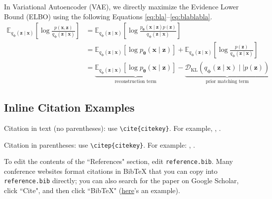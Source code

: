 \documentclass[12pt,letterpaper]{article}
\begin{document}
In Variational Autoencoder (VAE), we directly maximize the Evidence Lower Bound (ELBO) using the following Equations \ref{eq:bla}--\ref{eq:blablabla}.
\begin{align}
  \mathbb{E}_{q_{\boldsymbol{\phi}}(\boldsymbol{z}\mid\boldsymbol{x})}\left[\log\frac{p(\boldsymbol{x}, \boldsymbol{z})}{q_{\boldsymbol{\phi}}(\boldsymbol{z}\mid\boldsymbol{x})}\right]
  &= \mathbb{E}_{q_{\boldsymbol{\phi}}(\boldsymbol{z}\mid\boldsymbol{x})}\left[\log\frac{p_{\boldsymbol{\theta}}(\boldsymbol{x}\mid\boldsymbol{z})p(\boldsymbol{z})}{q_{\boldsymbol{\phi}}(\boldsymbol{z}\mid\boldsymbol{x})}\right] \label{eq:bla} \\
  &= \mathbb{E}_{q_{\boldsymbol{\phi}}(\boldsymbol{z}\mid\boldsymbol{x})}\left[\log p_{\boldsymbol{\theta}}(\boldsymbol{x}\mid\boldsymbol{z})\right] + \mathbb{E}_{q_{\boldsymbol{\phi}}(\boldsymbol{z}\mid\boldsymbol{x})}\left[\log\frac{p(\boldsymbol{z})}{q_{\boldsymbol{\phi}}(\boldsymbol{z}\mid\boldsymbol{x})}\right] \label{eq:blabla} \\
  &= \underbrace{\mathbb{E}_{q_{\boldsymbol{\phi}}(\boldsymbol{z}\mid\boldsymbol{x})}\left[\log p_{\boldsymbol{\theta}}(\boldsymbol{x}\mid\boldsymbol{z})\right]}_\text{reconstruction term} - \underbrace{\mathcal{D}_{\text{KL}}(q_{\boldsymbol{\phi}}(\boldsymbol{z}\mid\boldsymbol{x}) \mid\mid p(\boldsymbol{z}))}_\text{prior matching term} \label{eq:blablabla}
\end{align}

\subsection{Inline Citation Examples}

Citation in text (no parentheses): use \texttt{{\textbackslash}cite\{citekey\}}. 
For example, \cite{breiman2011}, \cite{devlin2019bert}.

Citation in parentheses: use \texttt{{\textbackslash}citep\{citekey\}}. 
For example: \citep{vaswani2023attention}, \citep{karras2019stylebased}.



\makereference

{\color{blue} To edit the contents of the ``References" section, edit \texttt{reference.bib}. Many conference websites format citations in BibTeX that you can copy into \texttt{reference.bib} directly; you can also search for the paper on Google Scholar, click ``Cite", and then click ``BibTeX" (\href{https://scholar.google.com/scholar?hl=en&as_sdt=0%2C23&q=attention+is+all+you+need&btnG=#d=gs_cit&t=1700436667623&u=%2Fscholar%3Fq%3Dinfo%3A5Gohgn6QFikJ%3Ascholar.google.com%2F%26output%3Dcite%26scirp%3D0%26hl%3Den}{here}'s an example).}
\end{document}
